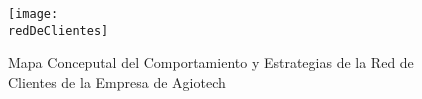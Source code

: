     \restoregeometry %






	\begin{figure}[h]
		\centering
		\texttt{[image: \\redDeClientes]}
		\caption{Mapa Conceputal del Comportamiento y Estrategias de la Red de Clientes de la Empresa de Agiotech}
	\end{figure}


